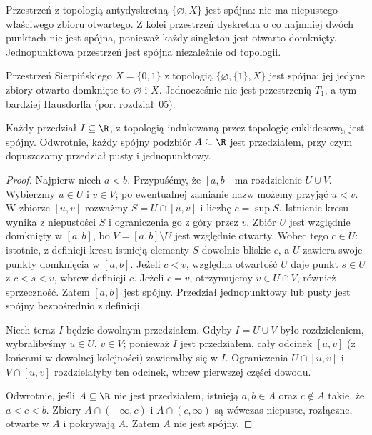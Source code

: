 \begin{przyklad}
\label{ex:topog-spojnosc-pierwsze}
Przestrzeń z topologią antydyskretną
$\{\varnothing,X\}$ jest spójna: nie ma niepustego
właściwego zbioru otwartego. Z kolei przestrzeń
dyskretna o co najmniej dwóch punktach nie jest
spójna, ponieważ każdy singleton jest
otwarto-domknięty. Jednopunktowa przestrzeń
jest spójna niezależnie od topologii.
\end{przyklad}

\begin{przyklad}
\label{ex:topog-spojnosc-sierpinski}
Przestrzeń Sierpińskiego $X=\{0,1\}$ z topologią
$\{\varnothing,\{1\},X\}$ jest spójna: jej jedyne
zbiory otwarto-domknięte to $\varnothing$ i $X$.
Jednocześnie nie jest przestrzenią $T_1$, a tym
bardziej Hausdorffa (por. rozdział~05).
\end{przyklad}

\begin{twierdzenie}
\label{thm:topog-spojnosc-przedzialy}
Każdy przedział $I\subseteq\R$, z topologią
indukowaną przez topologię euklidesową, jest
spójny. Odwrotnie, każdy spójny podzbiór
$A\subseteq\R$ jest przedziałem, przy czym
dopuszczamy przedział pusty i jednopunktowy.
\end{twierdzenie}
\begin{proof}
Najpierw niech $a<b$. Przypuśćmy, że $[a,b]$
ma rozdzielenie $U\cup V$. Wybierzmy $u\in U$
i $v\in V$; po ewentualnej zamianie nazw
możemy przyjąć $u<v$. W zbiorze $[u,v]$
rozważmy $S=U\cap[u,v]$ i liczbę $c=\sup S$.
Istnienie kresu wynika z niepustości $S$ i
ograniczenia go z góry przez $v$.
Zbiór $U$ jest względnie domknięty w $[a,b]$,
bo $V=[a,b]\setminus U$ jest względnie otwarty.
Wobec tego $c\in U$: istotnie, z definicji
kresu istnieją elementy $S$ dowolnie bliskie $c$,
a $U$ zawiera swoje punkty domknięcia w $[a,b]$.
Jeżeli $c<v$, względna otwartość $U$ daje
punkt $s\in U$ z $c<s<v$, wbrew definicji $c$.
Jeżeli $c=v$, otrzymujemy $v\in U\cap V$, również
sprzeczność. Zatem $[a,b]$ jest spójny.
Przedział jednopunktowy lub pusty jest spójny
bezpośrednio z definicji.

Niech teraz $I$ będzie dowolnym przedziałem.
Gdyby $I=U\cup V$ było rozdzieleniem,
wybralibyśmy $u\in U$, $v\in V$; ponieważ
$I$ jest przedziałem, cały odcinek $[u,v]$
(z końcami w dowolnej kolejności) zawierałby
się w $I$. Ograniczenia $U\cap[u,v]$ i
$V\cap[u,v]$ rozdzielałyby ten odcinek,
wbrew pierwszej części dowodu.

Odwrotnie, jeśli $A\subseteq\R$ nie jest
przedziałem, istnieją $a,b\in A$ oraz
$c\notin A$ takie, że $a<c<b$.
Zbiory $A\cap(-\infty,c)$ i $A\cap(c,\infty)$
są wówczas niepuste, rozłączne, otwarte
w $A$ i pokrywają $A$. Zatem $A$ nie jest
spójny.
\end{proof}

